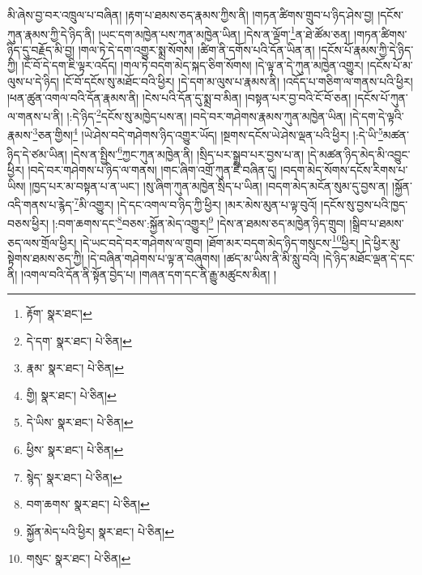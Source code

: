 མི་ཞེས་བྱ་བར་འཁྲུལ་པ་བཞིན། །རྟག་པ་ཐམས་ཅད་རྣམས་ཀྱིས་ནི། །གཏན་ཚིགས་གྲུབ་པ་ཉིད་ཤེས་བྱ། །དངོས་ཀུན་རྣམས་ཀྱི་དེ་ཉིད་ནི། །ཡང་དག་མཁྱེན་པས་ཀུན་མཁྱེན་ཡིན། །དེས་ན་ལྡོག་\footnote{རྟོག་  སྣར་ཐང་། }ན་ཐེ་ཚོམ་ཅན། །གཏན་ཚིགས་ཉིད་དུ་བརྗོད་མི་བྱ། །གལ་ཏེ་དེ་དག་འགྱུར་སྨྲ་སོགས། །ཚིག་ནི་དགོས་པའི་དོན་ཡིན་ན། །དངོས་པོ་རྣམས་ཀྱི་དེ་ཉིད་ཀྱི། །ངོ་བོ་དེ་དག་ཇི་ལྟར་འདོད། །གལ་ཏེ་བདག་མེད་སྐད་ཅིག་སོགས། །དེ་ལྟ་ན་དེ་ཀུན་མཁྱེན་འགྱུར། །དངོས་པོ་མ་ལུས་པ་དེ་ཉིད། །ངོ་བོ་དངོས་སུ་མཐོང་བའི་ཕྱིར། །དེ་དག་མ་ལུས་པ་རྣམས་ནི། །འདོད་པ་གཅིག་ལ་གནས་པའི་ཕྱིར། །ཕན་ཚུན་འགལ་བའི་དོན་རྣམས་ནི། །ངེས་པའི་དོན་དུ་སྨྲ་བ་མིན། །བསྟན་པར་བྱ་བའི་ངོ་བོ་ཅན། །དངོས་པོ་ཀུན་ལ་གནས་པ་ནི། །:དེ་ཉིད་\footnote{དེ་དག་  སྣར་ཐང་།  པེ་ཅིན། }དངོས་སུ་མཁྱེད་པས་ན། །བདེ་བར་གཤེགས་རྣམས་ཀུན་མཁྱེན་ཡིན། །དེ་དག་དེ་ལྟའི་རྣམས་\footnote{རྣམ་  སྣར་ཐང་།  པེ་ཅིན། }ཅན་གྱིས།\footnote{གྱི།  སྣར་ཐང་།  པེ་ཅིན། } །ཡེ་ཤེས་བདེ་གཤེགས་ཉིད་འགྱུར་ཡོད། །སྔགས་དངོས་ཡེ་ཤེས་ལྡན་པའི་ཕྱིར། །:དེ་ཡི་\footnote{དེ་ཡིས་  སྣར་ཐང་།  པེ་ཅིན། }མཚན་ཉིད་དེ་ཙམ་ཡིན། །དེས་ན་སྤྱིས་\footnote{ཕྱིས་  སྣར་ཐང་།  པེ་ཅིན། }ཀྱང་ཀུན་མཁྱེན་ནི། །སྲིད་པར་སྒྲུབ་པར་བྱས་པ་ན། །དེ་མཚན་ཉིད་མེད་མི་འབྱུང་ཕྱིར། །བདེ་བར་གཤེགས་པ་ཉིད་ལ་གནས། །གང་ཞིག་འགྲོ་ཀུན་ཇི་བཞིན་དུ། །བདག་མེད་སོགས་དངོས་རིགས་པ་ཡིས། །ཁྱད་པར་མ་བསྟན་པ་ན་ཡང་། །སུ་ཞིག་ཀུན་མཁྱེན་སྲིད་པ་ཡིན། །བདག་མེད་མངོན་སུམ་དུ་བྱས་ན། །སྐྱོན་འདི་གནས་པ་རྙེད་\footnote{སྙེད་  སྣར་ཐང་།  པེ་ཅིན། }མི་འགྱུར། །དེ་དང་འགལ་བ་ཉིད་ཀྱི་ཕྱིར། །མར་མེས་མུན་པ་ལྟ་བུའོ། །དངོས་སུ་བྱས་པའི་ཁྱད་བཅས་ཕྱིར། །:བག་ཆགས་དང་\footnote{བག་ཆགས་  སྣར་ཐང་།  པེ་ཅིན། }བཅས་:སྐྱོན་མེད་འགྱུར།\footnote{སྐྱོན་མེད་པའི་ཕྱིར།  སྣར་ཐང་།  པེ་ཅིན། } །དེས་ན་ཐམས་ཅད་མཁྱེན་ཉིད་གྲུབ། །སྒྲིབ་པ་ཐམས་ཅད་ལས་གྲོལ་ཕྱིར། །དེ་ཡང་བདེ་བར་གཤེགས་ལ་གྲུབ། །ཐོག་མར་བདག་མེད་ཉིད་གསུངས་\footnote{གསུང་  སྣར་ཐང་།  པེ་ཅིན། }ཕྱིར། །དེ་ཕྱིར་མུ་སྟེགས་ཐམས་ཅད་ཀྱི། །དེ་བཞིན་གཤེགས་པ་ལྟ་ན་བཞུགས། །ཚད་མ་ཡིས་ནི་མི་སླུ་བའི། །དེ་ཉིད་མཐོང་ལྡན་དེ་དང་ནི། །འགལ་བའི་དོན་ནི་སྟོན་བྱེད་པ། །གཞན་དག་དང་ནི་རྒྱུ་མཚུངས་མིན། །
